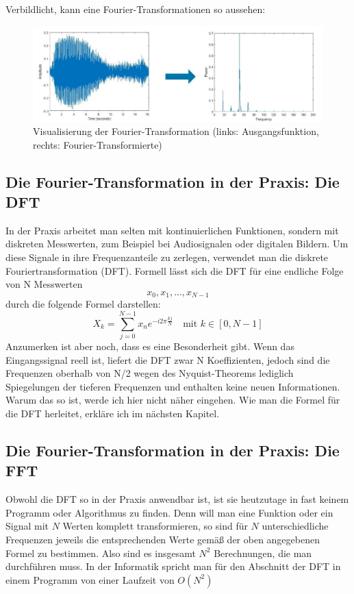 \documentclass[a4paper,12pt]{article}
\theoremstyle{definition}
\theoremstyle{remark}
\begin{document}
Verbildlicht, kann eine Fourier-Transformationen so aussehen: 
\begin{figure}[H]
\centering
\includegraphics[scale=0.5]{Bilder/fourier_vis.jpg}
\caption{Visualisierung der Fourier-Transformation (links: Ausgangsfunktion, rechts: Fourier-Transformierte)}
\end{figure}


\subsection{Die Fourier-Transformation in der Praxis: Die DFT}
In der Praxis arbeitet man selten mit kontinuierlichen Funktionen, sondern mit diskreten Messwerten, zum Beispiel bei Audiosignalen oder digitalen Bildern. Um diese Signale in ihre Frequenzanteile zu zerlegen, verwendet man die diskrete Fouriertransformation (DFT).
Formell lässt sich die DFT für eine endliche Folge von N Messwerten
$$x_0, x_1, ..., x_{N-1}$$
durch die folgende Formel darstellen:
$$X_k = \sum_{j = 0}^{N-1}{x_n e^{-i2\pi \frac{kj}{N}}} \quad \text{mit } k\in[0, N-1]$$
Anzumerken ist aber noch, dass es eine Besonderheit gibt. Wenn das Eingangssignal reell ist, 
liefert die DFT zwar N Koeffizienten, jedoch sind die Frequenzen oberhalb von N/2 wegen des 
Nyquist-Theorems lediglich Spiegelungen der tieferen Frequenzen und enthalten keine neuen 
Informationen. Warum das so ist, werde ich hier nicht näher eingehen. Wie man die Formel für 
die DFT herleitet, erkläre ich im nächsten Kapitel.

\subsection{Die Fourier-Transformation in der Praxis: Die FFT}
Obwohl die DFT so in der Praxis anwendbar ist, ist sie heutzutage in fast keinem Programm oder 
Algorithmus zu finden. Denn will man eine Funktion oder ein Signal mit $N$ Werten komplett 
transformieren, so sind für $N$ unterschiedliche Frequenzen jeweils die entsprechenden Werte gemäß der oben angegebenen Formel zu bestimmen. 
Also sind es insgesamt $N^2$ Berechnungen, die man durchführen muss. In der Informatik 
spricht man für den Abschnitt der DFT in einem Programm von einer Laufzeit von $O(N^2)$
\end{document}
